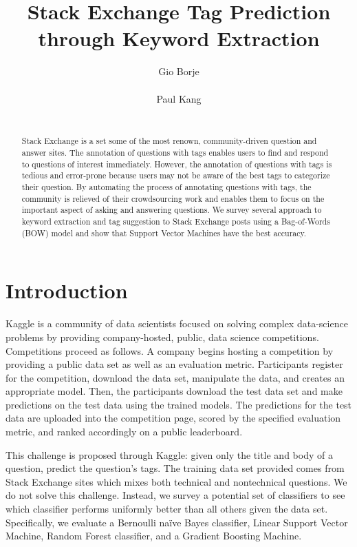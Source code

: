 \documentclass{sig-alternate}
\begin{document}
\sloppy

\title{Stack Exchange Tag Prediction through Keyword Extraction}
\author{
	\alignauthor
	Gio Borje \\
	 \\
	\alignauthor
	Paul Kang \\
	 \\
}
\maketitle

\begin{abstract}
	Stack Exchange is a set some of the most renown, community-driven
	question and answer sites. The annotation of questions with tags
	enables users to find and respond to questions of interest
	immediately. However, the annotation of questions with tags is tedious
	and error-prone because users may not be aware of the best tags to
	categorize their question. By automating the process of annotating
	questions with tags, the community is relieved of their crowdsourcing
	work and enables them to focus on the important aspect of asking and
	answering questions. We survey several approach to keyword extraction
	and tag suggestion to Stack Exchange posts using a Bag-of-Words (BOW)
	model and show that Support Vector Machines have the best accuracy.
\end{abstract}

\section{Introduction} %
\label{sec:Introduction}
	Kaggle is a community of data scientists focused on solving complex
	data-science problems by providing company-hosted, public, data
	science competitions. Competitions proceed as follows. A
	company begins hosting a competition by providing a public data set as
	well as an evaluation metric. Participants register for the
	competition, download the data set, manipulate the data, and creates
	an appropriate model. Then, the participants download the test data
	set and make predictions on the test data using the trained models.
	The predictions for the test data are uploaded into the competition
	page, scored by the specified evaluation metric, and ranked
	accordingly on a public leaderboard.

	This challenge is proposed through Kaggle: given only the title and body of
	a question, predict the question's tags. The training data set provided
	comes from Stack Exchange sites which mixes both technical and nontechnical
	questions. We do not solve this challenge. Instead, we survey a potential
	set of classifiers to see which classifier performs uniformly better than
	all others given the data set. Specifically, we evaluate a Bernoulli
	na\"{i}ve Bayes classifier, Linear Support Vector Machine, Random Forest
	classifier, and a Gradient Boosting Machine.
\end{document}
